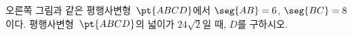 \noindent\begin{minipage}[t]{0.58\linewidth}\vspace{0pt}\raggedright 오른쪽 그림과 같은 평행사변형~$\pt{ABCD}$에서 $\seg{AB}=6$, $\seg{BC}=8$이다. 평행사변형~$\pt{ABCD}$의 넓이가 $24\sqrt{2}$일 때, $D$를 구하시오. \end{minipage}\hfill\begin{minipage}[t]{0.4\linewidth}\vspace{0pt}\centering \resizebox{\ifdim\width>\linewidth\linewidth\else\width\fi}{!}{}\end{minipage}\par
